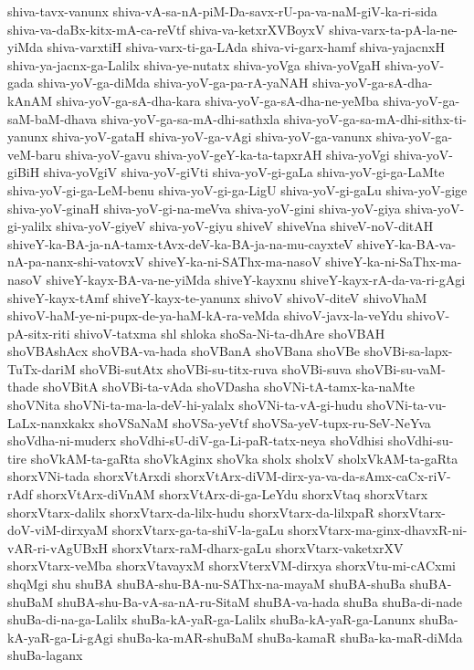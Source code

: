 {shiva-tavx-vanunx
shiva-vA-sa-nA-piM-Da-savx-rU-pa-va-naM-giV-ka-ri-sida
shiva-va-daBx-kitx-mA-ca-reVtf
shiva-va-ketxrXVBoyxV
shiva-varx-ta-pA-la-ne-yiMda
shiva-varxtiH
shiva-varx-ti-ga-LAda
shiva-vi-garx-hamf
shiva-yajacnxH
shiva-ya-jacnx-ga-Lalilx
shiva-ye-nutatx
shiva-yoVga
shiva-yoVgaH
shiva-yoV-gada
shiva-yoV-ga-diMda
shiva-yoV-ga-pa-rA-yaNAH
shiva-yoV-ga-sA-dha-kAnAM
shiva-yoV-ga-sA-dha-kara
shiva-yoV-ga-sA-dha-ne-yeMba
shiva-yoV-ga-saM-baM-dhava
shiva-yoV-ga-sa-mA-dhi-sathxla
shiva-yoV-ga-sa-mA-dhi-sithx-ti-yanunx
shiva-yoV-gataH
shiva-yoV-ga-vAgi
shiva-yoV-ga-vanunx
shiva-yoV-ga-veM-baru
shiva-yoV-gavu
shiva-yoV-geY-ka-ta-tapxrAH
shiva-yoVgi
shiva-yoV-giBiH
shiva-yoVgiV
shiva-yoV-giVti
shiva-yoV-gi-gaLa
shiva-yoV-gi-ga-LaMte
shiva-yoV-gi-ga-LeM-benu
shiva-yoV-gi-ga-LigU
shiva-yoV-gi-gaLu
shiva-yoV-gige
shiva-yoV-ginaH
shiva-yoV-gi-na-meVva
shiva-yoV-gini
shiva-yoV-giya
shiva-yoV-gi-yalilx
shiva-yoV-giyeV
shiva-yoV-giyu
shiveV
shiveVna
shiveV-noV-ditAH
shiveY-ka-BA-ja-nA-tamx-tAvx-deV-ka-BA-ja-na-mu-cayxteV
shiveY-ka-BA-va-nA-pa-nanx-shi-vatovxV
shiveY-ka-ni-SAThx-ma-nasoV
shiveY-ka-ni-SaThx-ma-nasoV
shiveY-kayx-BA-va-ne-yiMda
shiveY-kayxnu
shiveY-kayx-rA-da-va-ri-gAgi
shiveY-kayx-tAmf
shiveY-kayx-te-yanunx
shivoV
shivoV-diteV
shivoVhaM
shivoV-haM-ye-ni-pupx-de-ya-haM-kA-ra-veMda
shivoV-javx-la-veYdu
shivoV-pA-sitx-riti
shivoV-tatxma
shl
shloka
shoSa-Ni-ta-dhAre
shoVBAH
shoVBAshAcx
shoVBA-va-hada
shoVBanA
shoVBana
shoVBe
shoVBi-sa-lapx-TuTx-dariM
shoVBi-sutAtx
shoVBi-su-titx-ruva
shoVBi-suva
shoVBi-su-vaM-thade
shoVBitA
shoVBi-ta-vAda
shoVDasha
shoVNi-tA-tamx-ka-naMte
shoVNita
shoVNi-ta-ma-la-deV-hi-yalalx
shoVNi-ta-vA-gi-hudu
shoVNi-ta-vu-LaLx-nanxkakx
shoVSaNaM
shoVSa-yeVtf
shoVSa-yeV-tupx-ru-SeV-NeYva
shoVdha-ni-muderx
shoVdhi-sU-diV-ga-Li-paR-tatx-neya
shoVdhisi
shoVdhi-su-tire
shoVkAM-ta-gaRta
shoVkAginx
shoVka
sholx
sholxV
sholxVkAM-ta-gaRta
shorxVNi-tada
shorxVtArxdi
shorxVtArx-diVM-dirx-ya-va-da-sAmx-caCx-riV-rAdf
shorxVtArx-diVnAM
shorxVtArx-di-ga-LeYdu
shorxVtaq
shorxVtarx
shorxVtarx-dalilx
shorxVtarx-da-lilx-hudu
shorxVtarx-da-lilxpaR
shorxVtarx-doV-viM-dirxyaM
shorxVtarx-ga-ta-shiV-la-gaLu
shorxVtarx-ma-ginx-dhavxR-ni-vAR-ri-vAgUBxH
shorxVtarx-raM-dharx-gaLu
shorxVtarx-vaketxrXV
shorxVtarx-veMba
shorxVtavayxM
shorxVterxVM-dirxya
shorxVtu-mi-cACxmi
shqMgi
shu
shuBA
shuBA-shu-BA-nu-SAThx-na-mayaM
shuBA-shuBa
shuBA-shuBaM
shuBA-shu-Ba-vA-sa-nA-ru-SitaM
shuBA-va-hada
shuBa
shuBa-di-nade
shuBa-di-na-ga-Lalilx
shuBa-kA-yaR-ga-Lalilx
shuBa-kA-yaR-ga-Lanunx
shuBa-kA-yaR-ga-Li-gAgi
shuBa-ka-mAR-shuBaM
shuBa-kamaR
shuBa-ka-maR-diMda
shuBa-laganx
}
